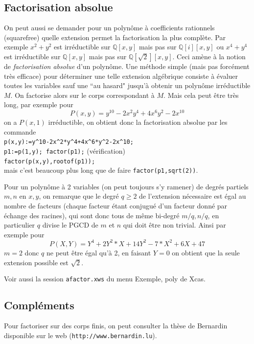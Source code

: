 \documentclass[a4paper,11pt]{article}
\newcommand{\Q}{{\mathbb{Q}}}
\begin{document}
\begin{giacjshere}
\subsection{Factorisation absolue} \label{sec:factorisation_absolue}
On peut aussi se demander pour un polyn\^ome \`a coefficients
rationnels (squarefree) quelle extension 
permet la factorisation la plus
compl\`ete. Par exemple $x^2+y^2$ est irr\'eductible sur $\Q[x,y]$
mais pas sur $\Q[i][x,y]$ ou $x^4+y^4$ est irr\'eductible sur $\Q[x,y]$
mais pas sur $\Q[\sqrt{2}][x,y]$. Ceci am\`ene \`a la notion
de {\em factorisation absolue} d'un polyn\^ome. Une m\'ethode simple
(mais pas forc\'ement tr\`es efficace) pour d\'eterminer une telle
extension alg\'ebrique consiste \`a \'evaluer toutes les variables
sauf une ``au hasard" jusqu'\`a obtenir un polyn\^ome irr\'eductible $M$.
On factorise alors sur le corps correspondant \`a $M$. Mais cela
peut \^etre tr\`es long, par exemple pour 
\[ P(x,y)=y^{10}-2x^2y^4+4x^6y^2-2x^{10}\]
on a $P(x,1)$ irr\'eductible, on obtient donc la factorisation
absolue par les commande\\
\verb|p(x,y):=y^10-2x^2*y^4+4x^6*y^2-2x^10;|\\
\verb|p1:=p(1,y); factor(p1);| (v\'erification)\\
\verb|factor(p(x,y),rootof(p1));|\\
mais c'est beaucoup plus long que de faire \verb|factor(p1,sqrt(2))|.

Pour un polyn\^ome \`a 2 variables (on peut toujours s'y ramener) de
degr\'es partiels $m,n$ en $x,y$,
on remarque que le degr\'e $q \geq 2$ de l'extension n\'ecessaire est
\'egal au nombre de facteurs (chaque facteur \'etant conjugu\'e d'un
facteur donn\'e par \'echange des racines), qui sont donc tous de m\^eme
bi-degr\'e $m/q,n/q$, en particulier $q$ divise le PGCD de $m$ et $n$
qui doit \^etre non trivial. Ainsi par exemple pour 
$$ P(X,Y)=Y^4 +2Y^2*X+14Y^2 -7*X^2 +6X+47$$
$m=2$ donc $q$ ne peut \^etre \'egal qu'\`a 2, en faisant $Y=0$ on
obtient que la seule extension possible est $\sqrt{2}$.

Voir aussi la session \verb|afactor.xws| du menu Exemple, poly de Xcas.

\subsection{Compl\'ements}
Pour factoriser sur des corps finis, on peut consulter la thèse
de Bernardin disponible sur le web (\verb|http://www.bernardin.lu|).


\end{giacjshere}
\end{document}
